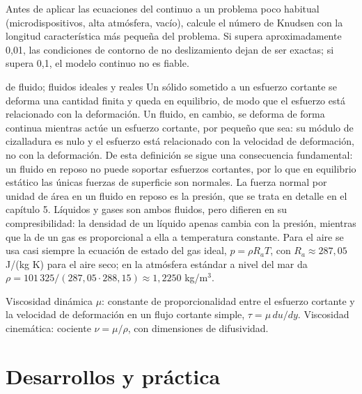\documentclass[10pt,openany]{book}
\begin{document}
\begin{tcolorbox}[title={Consejo}, studiumtip, breakable]

Antes de aplicar las ecuaciones del continuo a un problema poco habitual (microdispositivos, alta atmósfera, vacío), calcule el número de Knudsen con la longitud característica más pequeña del problema. Si supera aproximadamente 0,01, las condiciones de contorno de no deslizamiento dejan de ser exactas; si supera 0,1, el modelo continuo no es fiable.
\end{tcolorbox}

\begin{tcolorbox}[title={Definición}, studiumdef, breakable]

de fluido; fluidos ideales y reales
Un sólido sometido a un esfuerzo cortante se deforma una cantidad finita y queda en equilibrio, de modo que el esfuerzo está relacionado con la deformación. Un fluido, en cambio, se deforma de forma continua mientras actúe un esfuerzo cortante, por pequeño que sea: su módulo de cizalladura es nulo y el esfuerzo está relacionado con la velocidad de deformación, no con la deformación. De esta definición se sigue una consecuencia fundamental: un fluido en reposo no puede soportar esfuerzos cortantes, por lo que en equilibrio estático las únicas fuerzas de superficie son normales. La fuerza normal por unidad de área en un fluido en reposo es la presión, que se trata en detalle en el capítulo 5. Líquidos y gases son ambos fluidos, pero difieren en su compresibilidad: la densidad de un líquido apenas cambia con la presión, mientras que la de un gas es proporcional a ella a temperatura constante. Para el aire se usa casi siempre la ecuación de estado del gas ideal, \(p = \rho R_a T\), con \(R_a \approx 287{,}05\) J/(kg K) para el aire seco; en la atmósfera estándar a nivel del mar da \(\rho = 101\,325/(287{,}05\cdot 288{,}15) \approx 1{,}2250\) kg/m\(^3\).
\end{tcolorbox}

\begin{tcolorbox}[title={Definición}, studiumdef, breakable]

Viscosidad dinámica \(\mu\): constante de proporcionalidad entre el esfuerzo cortante y la velocidad de deformación en un flujo cortante simple, \(\tau = \mu\,du/dy\). Viscosidad cinemática: cociente \(\nu = \mu/\rho\), con dimensiones de difusividad.
\end{tcolorbox}



\section{Desarrollos y práctica}
\end{document}
